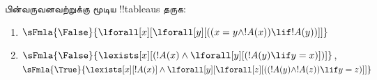 \documentclass[../../../include/open-logic-section]{subfiles}
\begin{document}
\begin{prob}
பின்வருவனவற்றுக்கு மூடிய !!{tableau}s தருக:
\begin{enumerate}
\item $\sFmla{\False}{\lforall[x][\lforall[y][((x = y \land !A(x))
      \lif !A(y))]]}$
\item $\sFmla{\False}{\lexists[x][(!A(x) \land
    \lforall[y][(!A(y) \lif y = x)])]}$,\\
  $\sFmla{\True}{\lexists[x][!A(x)] \land
    \lforall[y][\lforall[z][((!A(y) \land !A(z)) \lif y = z)]]}$
\end{enumerate}
\end{prob}
\end{document}
